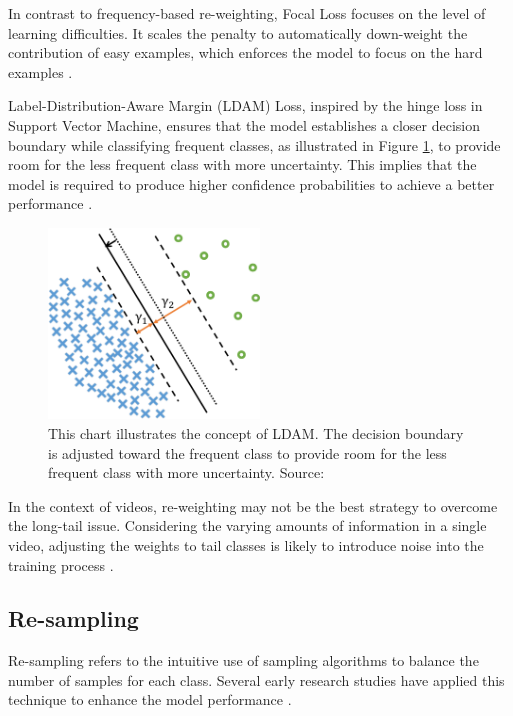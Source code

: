 In contrast to frequency-based re-weighting, Focal Loss focuses on the level of learning difficulties. It scales the penalty to automatically down-weight the contribution of easy examples, which enforces the model to focus on the hard examples \parencite{lin2017focal}.

Label-Distribution-Aware Margin (LDAM) Loss, inspired by the hinge loss in Support Vector Machine, ensures that the model establishes a closer decision boundary while classifying frequent classes, as illustrated in Figure \ref{fig:concetpldam}, to provide room for the less frequent class with more uncertainty. This implies that the model is required to produce higher confidence probabilities to achieve a better performance \parencite{cao2019learning}.

\begin{figure}[ht]
    \centering
    \includegraphics[width=0.5\textwidth]{assets/charts_rw/LDAM}
    \caption[LDAM illustration]{This chart illustrates the concept of LDAM. The decision boundary is adjusted toward the frequent class to provide room for the less frequent class with more uncertainty. Source: \parencite{cao2019learning}}
    \label{fig:concetpldam}
\end{figure}

In the context of videos, re-weighting may not be the best strategy to overcome the long-tail issue. Considering the varying amounts of information in a single video, adjusting the weights to tail classes is likely to introduce noise into the training process \parencite{zhang2021videolt}. 

\subsection{Re-sampling}
Re-sampling refers to the intuitive use of sampling algorithms to balance the number of samples for each class. Several early research studies have applied this technique to enhance the model performance \parencite{shen2016relay, 5128907, mahajan2018exploring}.

